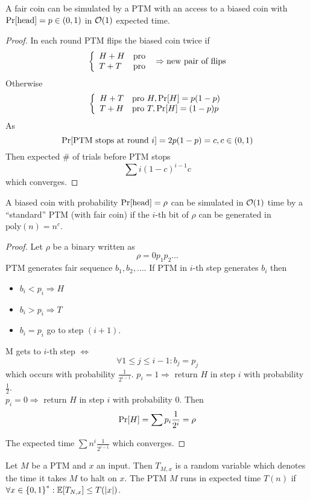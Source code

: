 \begin{lemma}
	A fair coin can be simulated by a PTM with an access to a biased coin with $\operatorname{Pr}[\text{head}]=p\in(0,1)$ in $\mathcal{O}(1)$ expected time.
\end{lemma}
\begin{proof}
	In each round PTM flips the biased coin twice if
	\[ \left\{ \begin{array}{ll} H + H & \mbox{pro }  \\ T + T & \mbox{pro }  \end{array} \right. \Rightarrow \text{new pair of flips} \]
	Otherwise
	\[ \left\{ \begin{array}{ll} H + T & \mbox{pro } H, \operatorname{Pr}[H] = p (1 - p) \\ T + H & \mbox{pro } T, \operatorname{Pr}[H] = (1 - p) p \end{array} \right.\]
	As
	\[ \operatorname{Pr}[\text{PTM stops at round}\ i] = 2 p (1 - p) = c, c \in (0, 1) \]
	Then expected \# of trials before PTM stops
	\[ \sum i (1 - c)^{i - 1} c \]
	which converges.
\end{proof}
\begin{lemma}
	A biased coin with probability $\operatorname{Pr}[\text{head}]=\rho$ can be simulated in $\mathcal{O}(1)$ time by a ``standard'' PTM (with fair coin) if the $i$-th bit of $\rho$ can be generated in $\text{poly}(n) = n^c$.
\end{lemma}
\begin{proof}
	Let $\rho$ be a binary written as
	\[ \rho = 0p_1p_2 \ldots \]
	PTM generates fair sequence $b_1, b_2, \ldots$.
	If PTM in $i$-th step generates $b_i$ then
	\begin{itemize}
		\item $b_i < p_i \Rightarrow H$
		\item $b_i > p_i \Rightarrow T$
		\item $b_i = p_i$ go to step $(i + 1)$.
	\end{itemize}
	M gets to $i$-th step $\iff$
	\[ \forall 1 \leq j \leq i - 1: b_j = p_j \]
	which occurs with probability $\frac{1}{2^{i - 1}}$.
	$p_i = 1 \Rightarrow$ return $H$ in step $i$ with probability $\frac{1}{2}$.\\
	$p_i = 0 \Rightarrow$ return $H$ in step $i$ with probability $0$.
	Then
	\[ \operatorname{Pr}[H] = \sum p_i \frac{1}{2^i} = \rho \]

	The expected time $\sum n^i \frac{1}{2^{i - 1}}$ which converges.
\end{proof}

\begin{definition}
    Let $M$ be a PTM and $x$ an input.
    Then $T_{M,x}$ is a random variable which denotes the time it takes $M$ to halt on $x$.
    The PTM $M$ runs in expected time $T(n)$ if $\forall x \in \operatorname{\{ 0, 1 \}}^{\ast}: \mathbb{E}[T_{N,x}] \leq T(|x|)$.
\end{definition}

